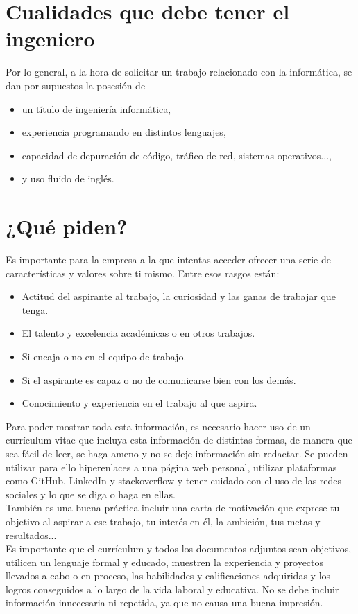 \documentclass[11pt,a4paper]{article}
\begin{document}
\newpage

\section{Cualidades que debe tener el ingeniero}

Por lo general, a la hora de solicitar un trabajo relacionado con la informática, se dan por supuestos la posesión de

\begin{itemize}
	\item un título de ingeniería informática,
	\item experiencia programando en distintos lenguajes,
	\item capacidad de depuración de código, tráfico de red, sistemas operativos...,
	\item y uso fluido de inglés.
\end{itemize}

\section{¿Qué piden?}

Es importante para la empresa a la que intentas acceder ofrecer una serie de características y valores sobre ti mismo. Entre esos rasgos están:

\begin{itemize}
	\item Actitud del aspirante al trabajo, la curiosidad y las ganas de trabajar que tenga.
	\item El talento y excelencia académicas o en otros trabajos.
	\item Si encaja o no en el equipo de trabajo.
	\item Si el aspirante es capaz o no de comunicarse bien con los demás.
	\item Conocimiento y experiencia en el trabajo al que aspira.
\end{itemize}

Para poder mostrar toda esta información, es necesario hacer uso de un currículum vitae que incluya esta información de distintas formas, de manera que sea fácil de leer, se haga ameno y no se deje información sin redactar. Se pueden utilizar para ello hiperenlaces a una página web personal, utilizar plataformas como GitHub, LinkedIn y stackoverflow y tener cuidado con el uso de las redes sociales y lo que se diga o haga en ellas.\\ 

También es una buena práctica incluir una carta de motivación que exprese tu objetivo al aspirar a ese trabajo, tu interés en él, la ambición, tus metas y resultados...\\

Es importante que el currículum y todos los documentos adjuntos sean objetivos, utilicen un lenguaje formal y educado, muestren la experiencia y proyectos llevados a cabo o en proceso, las habilidades y calificaciones adquiridas y los logros conseguidos a lo largo de la vida laboral y educativa. No se debe incluir información innecesaria ni repetida, ya que no causa una buena impresión.
\end{document}
